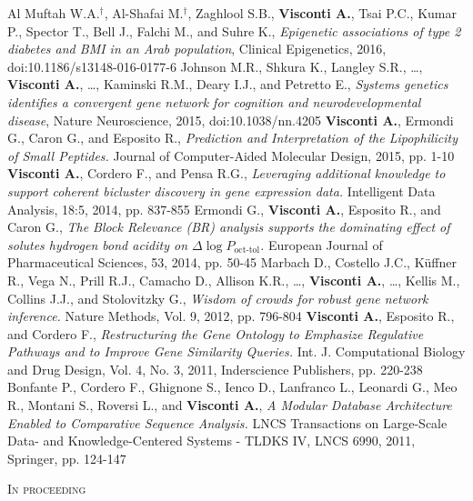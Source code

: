\documentclass[a4paper,10pt]{article}
\newcommand{\smalltitle}[1]{
	\vspace{0.1cm}
	{\noindent 
	\large \textsc{#1}}
	\vspace{0.1cm}
}
\begin{document}
{\begin{itemize}
		 Al Muftah W.A.$^{\textbf{$\dag $}}$, Al-Shafai M.$^{\textbf{$\dag $}}$, Zaghlool S.B., \textbf{Visconti A.}, Tsai P.C., Kumar P., Spector T., Bell J., Falchi M., and Suhre K., \emph{Epigenetic associations of type 2 diabetes and BMI in an Arab population}, Clinical Epigenetics, 2016, doi:10.1186/s13148-016-0177-6
		 Johnson M.R., Shkura K., Langley S.R., \dots, \textbf{Visconti A.}, \dots, Kaminski R.M., Deary I.J., and Petretto E., \emph{Systems genetics identifies a convergent gene network for cognition and neurodevelopmental disease}, Nature Neuroscience, 2015, doi:10.1038/nn.4205
		\textbf{Visconti A.}, Ermondi G., Caron G., and Esposito R., \emph{Prediction and Interpretation of the Lipophilicity of Small Peptides.} Journal of Computer-Aided Molecular Design, 2015, pp. 1-10
		\textbf{Visconti A.}, Cordero F., and Pensa R.G., \emph{Leveraging additional knowledge to support coherent bicluster discovery in gene expression data.} Intelligent Data Analysis, 18:5, 2014, pp. 837-855
		Ermondi G., \textbf{Visconti A.}, Esposito R., and Caron G., \emph{The Block Relevance (BR) analysis supports the dominating effect of solutes hydrogen bond acidity on $\Delta \log P_{\text{oct-tol}}$.} European Journal of Pharmaceutical Sciences, 53, 2014, pp. 50-45
		 Marbach D., Costello J.C., K\"{u}ffner R., Vega N., Prill R.J., Camacho D., Allison K.R., \dots, \textbf{Visconti A.}, \dots, Kellis M., Collins J.J., and Stolovitzky G., \emph{Wisdom of crowds for robust gene network inference.} Nature Methods, Vol. 9, 2012, pp. 796-804		
		 \textbf{Visconti A.}, Esposito R., and Cordero F., \emph{Restructuring the Gene Ontology to Emphasize Regulative Pathways and to Improve Gene Similarity Queries.} Int. J. Computational Biology and Drug Design, Vol. 4, No. 3, 2011, Inderscience Publishers, pp. 220-238
		 Bonfante P., Cordero F., Ghignone S., Ienco D., Lanfranco L., Leonardi G., Meo R., Montani S., Roversi L., and \textbf{Visconti A.}, \emph{A Modular Database Architecture Enabled to Comparative Sequence Analysis.} LNCS Transactions on Large-Scale Data- and Knowledge-Centered Systems - TLDKS IV, LNCS 6990, 2011, Springer, pp. 124-147 
	\end{itemize}
}

\vspace{0.4cm}
\newpage

\smalltitle{In proceeding}
\end{document}
